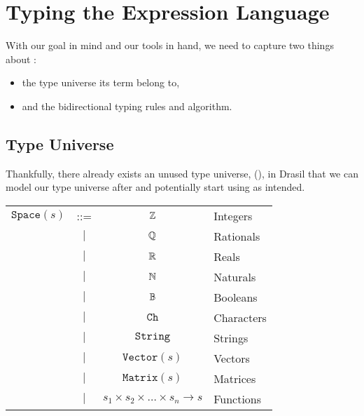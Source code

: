 \section{Typing the Expression Language}
\label{chap:typed-expr:sec:typing-the-expression-language}

With our goal in mind and our tools in hand, we need to capture two things about
\Expr{}:
\begin{itemize}
      \item the type universe its term belong to,
      \item and the bidirectional typing rules and algorithm.
\end{itemize}

\subsection{Type Universe}
\label{chap:typed-expr:sec:typing-the-expression-language:subsec:type-universe}

Thankfully, there already exists an unused type universe, \Space{}
(), in Drasil that we can model our type universe
after and potentially start using as intended.

\begin{longtable}{ r c c l}
      \(\texttt{Space}(s)\) & ::=       & \(\mathbb{Z}\)                                                  & Integers   \\
                            & \(\vert\) & \(\mathbb{Q}\)                                                  & Rationals  \\
                            & \(\vert\) & \(\mathbb{R}\)                                                  & Reals      \\
                            & \(\vert\) & \(\mathbb{N}\)                                                  & Naturals   \\
                            & \(\vert\) & \(\mathbb{B}\)                                                  & Booleans   \\
                            & \(\vert\) & \(\texttt{Ch}\)                                             & Characters \\
                            & \(\vert\) & \(\texttt{String}\)                                         & Strings    \\
                            & \(\vert\) & \(\texttt{Vector}(s)\)                                      & Vectors    \\
                            & \(\vert\) & \(\texttt{Matrix}(s)\)                                      & Matrices   \\
                            & \(\vert\) & \(s_1 \times s_2 \times \ldots{} \times s_n \rightarrow s\) & Functions  \\
\end{longtable}

